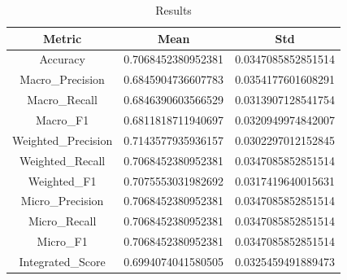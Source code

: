 \begin{table}[htbp]
\centering
\caption{Results}
\label{tab:csv}
\small
\setlength{\tabcolsep}{4pt}
\begin{tabular}{|c|c|c|}
\hline
Metric & Mean & Std \\
\hline
Accuracy & 0.7068452380952381 & 0.0347085852851514 \\
Macro_Precision & 0.6845904736607783 & 0.0354177601608291 \\
Macro_Recall & 0.6846390603566529 & 0.0313907128541754 \\
Macro_F1 & 0.6811818711940697 & 0.0320949974842007 \\
Weighted_Precision & 0.7143577935936157 & 0.0302297012152845 \\
Weighted_Recall & 0.7068452380952381 & 0.0347085852851514 \\
Weighted_F1 & 0.7075553031982692 & 0.0317419640015631 \\
Micro_Precision & 0.7068452380952381 & 0.0347085852851514 \\
Micro_Recall & 0.7068452380952381 & 0.0347085852851514 \\
Micro_F1 & 0.7068452380952381 & 0.0347085852851514 \\
Integrated_Score & 0.6994074041580505 & 0.0325459491889473 \\
\hline
\end{tabular}
\end{table}